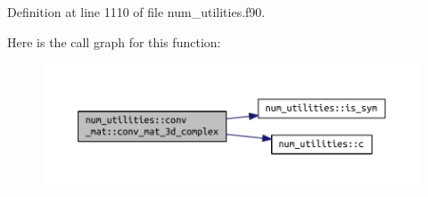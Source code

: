 Definition at line 1110 of file num\+\_\+utilities.\+f90.

Here is the call graph for this function\+:\nopagebreak
\begin{figure}[H]
\begin{center}
\leavevmode
\includegraphics[width=350pt]{interfacenum__utilities_1_1conv__mat_a1675a562dfca75f73d1a162e386f48d5_cgraph}
\end{center}
\end{figure}


